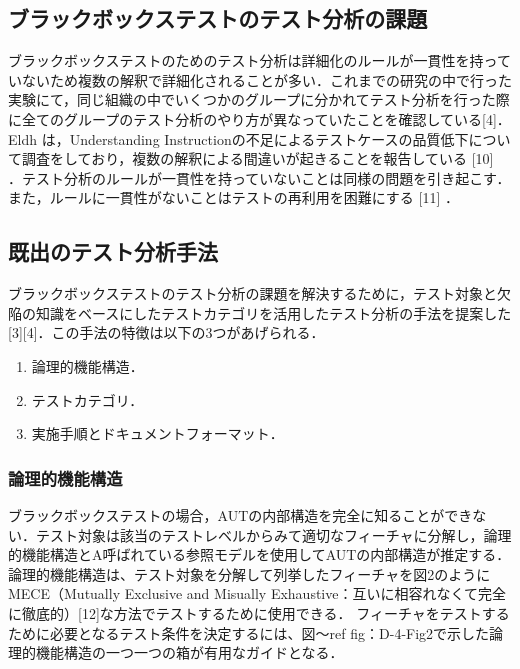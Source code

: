 \documentclass[a4paper,11pt]{jreport}
\begin{document}
\subsection{ブラックボックステストのテスト分析の課題}
ブラックボックステストのためのテスト分析は詳細化のルールが一貫性を持っていないため複数の解釈で詳細化されることが多い．これまでの研究の中で行った実験にて，同じ組織の中でいくつかのグループに分かれてテスト分析を行った際に全てのグループのテスト分析のやり方が異なっていたことを確認している[4]．Eldh は，Understanding Instructionの不足によるテストケースの品質低下について調査をしており，複数の解釈による間違いが起きることを報告している [10] ．テスト分析のルールが一貫性を持っていないことは同様の問題を引き起こす．また，ルールに一貫性がないことはテストの再利用を困難にする [11] ．

\subsection{既出のテスト分析手法}
ブラックボックステストのテスト分析の課題を解決するために，テスト対象と欠陥の知識をベースにしたテストカテゴリを活用したテスト分析の手法を提案した[3][4]．この手法の特徴は以下の3つがあげられる．

\begin{enumerate}
\item 論理的機能構造．
\item テストカテゴリ．
\item 実施手順とドキュメントフォーマット．
\end{enumerate}

\subsubsection{論理的機能構造}

ブラックボックステストの場合，AUTの内部構造を完全に知ることができない．テスト対象は該当のテストレベルからみて適切なフィーチャに分解し，論理的機能構造とA呼ばれている参照モデルを使用してAUTの内部構造が推定する． 論理的機能構造は、テスト対象を分解して列挙したフィーチャを図2のようにMECE（Mutually Exclusive and Misually Exhaustive：互いに相容れなくて完全に徹底的）[12]な方法でテストするために使用できる． フィーチャをテストするために必要となるテスト条件を決定するには、図〜ref {fig：D-4-Fig2}で示した論理的機能構造の一つ一つの箱が有用なガイドとなる．
\end{document}
